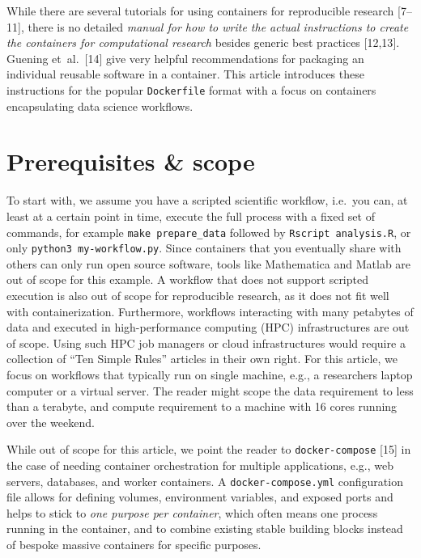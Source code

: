 \documentclass[10pt,letterpaper]{article}
\begin{document}
While there are several tutorials for using containers for reproducible
research {[}7--11{]}, there is no detailed \emph{manual for how to write
the actual instructions to create the containers for computational
research} besides generic best practices {[}12,13{]}. Guening
et~al.~{[}14{]} give very helpful recommendations for packaging an
individual reusable software in a container. This article introduces
these instructions for the popular \texttt{Dockerfile} format with a
focus on containers encapsulating data science workflows.

\hypertarget{prerequisites-scope}{%
\section{Prerequisites \& scope}\label{prerequisites-scope}}

To start with, we assume you have a scripted scientific workflow,
i.e.~you can, at least at a certain point in time, execute the full
process with a fixed set of commands, for example
\texttt{make\ prepare\_data} followed by \texttt{Rscript\ analysis.R},
or only \texttt{python3\ my-workflow.py}. Since containers that you
eventually share with others can only run open source software, tools
like Mathematica and Matlab are out of scope for this example. A
workflow that does not support scripted execution is also out of scope
for reproducible research, as it does not fit well with
containerization. Furthermore, workflows interacting with many petabytes
of data and executed in high-performance computing (HPC) infrastructures
are out of scope. Using such HPC job managers or cloud infrastructures
would require a collection of ``Ten Simple Rules'' articles in their own
right. For this article, we focus on workflows that typically run on
single machine, e.g., a researchers laptop computer or a virtual server.
The reader might scope the data requirement to less than a terabyte, and
compute requirement to a machine with 16 cores running over the weekend.

While out of scope for this article, we point the reader to
\texttt{docker-compose} {[}15{]} in the case of needing container
orchestration for multiple applications, e.g., web servers, databases,
and worker containers. A \texttt{docker-compose.yml} configuration file
allows for defining volumes, environment variables, and exposed ports
and helps to stick to \emph{one purpose per container}, which often
means one process running in the container, and to combine existing
stable building blocks instead of bespoke massive containers for
specific purposes.
\end{document}
